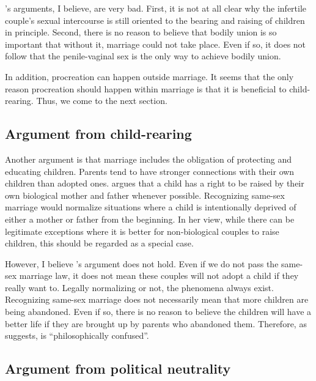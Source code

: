 \documentclass[man,floatsintext]{apa7}
\begin{document}
's arguments, I believe, are very bad. First, it is not at all clear why the infertile couple's sexual intercourse is still oriented to the bearing and raising of children in principle. Second, there is no reason to believe that bodily union is so important that without it, marriage could not take place. Even if so, it does not follow that the penile-vaginal sex is the only way to achieve bodily union.

In addition, procreation can happen outside marriage. It seems that the only reason procreation should happen within marriage is that it is beneficial to child-rearing. Thus, we come to the next section. 

\subsection{Argument from child-rearing}

Another argument is that marriage includes the obligation of protecting and educating children. Parents tend to have stronger connections with their own children than adopted ones. \textcite{somervilleCaseSameSexMarriage2012} argues that a child has a right to be raised by their own biological mother and father whenever possible. Recognizing same-sex marriage would normalize situations where a child is intentionally deprived of either a mother or father from the beginning. In her view, while there can be legitimate exceptions where it is better for non-biological couples to raise children, this should be regarded as a special case.

However, I believe 's argument does not hold. Even if we do not pass the same-sex marriage law, it does not mean these couples will not adopt a child if they really want to. Legally normalizing or not, the phenomena always exist. Recognizing same-sex marriage does not necessarily mean that more children are being abandoned. Even if so, there is no reason to believe the children will have a better life if they are brought up by parents who abandoned them. Therefore, as \textcite{murphySameSexMarriageNot2011} suggests,  is ``philosophically confused''.

\subsection{Argument from political neutrality}
\label{poli}
\end{document}
